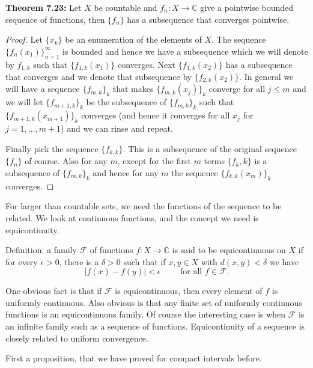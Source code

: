 \documentclass[12pt]{book}
\newcommand{\abs}[1]{\left\lvert {#1} \right\rvert}
\newcommand{\C}{{\mathbb{C}}}
\newcommand{\sF}{{\mathcal{F}}}
\theoremstyle{plain}
\theoremstyle{remark}
\theoremstyle{definition}
\theoremstyle{exercise}
\theoremstyle{example}
\begin{document}
\medskip

\textbf{Theorem 7.23:}
Let $X$ be countable and $f_n \colon X \to \C$ give a pointwise bounded
sequence of functions, then $\{ f_n \}$ has a subsequence that converges
pointwise.

\begin{proof}
Let $\{ x_k \}$ be an enumeration of the elements of $X$.
The sequence $\{ f_n(x_1) \}_{n=1}^\infty$ is bounded and hence
we have a subsequence which we will denote by
$f_{1,k}$ such that $\{ f_{1,k}(x_1) \}$ converges.
Next $\{ f_{1,k}(x_2) \}$ has a subsequence that converges and
we denote that subsequence by
$\{ f_{2,k}(x_2) \}$.  In general we will have a sequence $\{ f_{m,k} \}_k$
that makes $\{ f_{m,k}(x_j) \}_k$ converge for all $j \leq m$ and we will
let $\{ f_{m+1,k} \}_k$ be the subsequence of $\{ f_{m,k} \}_k$
such that
$\{ f_{m+1,k}(x_{m+1}) \}_k$ converges (and hence it converges for all
$x_j$ for $j=1,\ldots,m+1$) and we can rinse and repeat.

Finally pick the sequence
$\{ f_{k,k} \}$.  This is a subsequence of the original sequence $\{ f_n \}$
of course.  Also for any $m$,
except for the first $m$ terms $\{ f_k,k \}$ is a subsequence of $\{ f_{m,k} \}_k$
and hence for any $m$ the sequence $\{ f_{k,k}(x_m) \}_k$ converges.
\end{proof}

\medskip

For larger than countable sets,
we need the functions of the sequence to be related.  We look at
continuous functions, and the concept we need is equicontinuity.

Definition: a family $\sF$ of functions $f \colon X \to \C$ is said to be
equicontinuous on $X$ if for every $\epsilon > 0$, there is a $\delta > 0$
such that if $x, y \in X$ with $d(x,y) < \delta$ we have
$$
\abs{f(x)-f(y)} < \epsilon \qquad \text{ for all $f \in \sF$} .
$$

One obvious fact is that if $\sF$ is equicontinuous, then every element of
$f$ is uniformly continuous.  Also obvious is that any finite set of
uniformly continuous functions is an equicontinuous family.  Of course the
interesting case is when $\sF$ is an infinite family such as a sequence of
functions.  Equicontinuity of a sequence
is closely related to uniform convergence.

\medskip

First a proposition, that we have proved for compact intervals before.

\medskip
\end{document}
